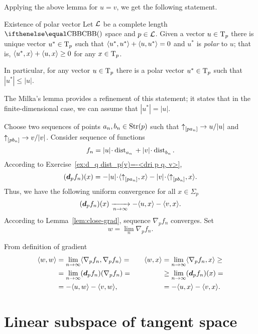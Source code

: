 Applying the above lemma for $u=v$, we get the following statement.

\begin{thm}{Existence of polar vector}\label{cor:polar}
Let $\mathcal{L}$ be a complete length $\Alex{}$ space 
and $p\in \spc{L}$. 
Given a vector $u\in \T_p$ there is unique vector $u^*\in\T_p$ such that $\langle u^*,u^*\rangle+\langle u,u^*\rangle= 0$ and
$u^*$ is \emph{polar} to $u$;
that is,
 $\<u^*,x\>+\<u,x\>\ge 0$ for any $x\in \T_p$.

In particular, for any vector $u\in \T_p$ there is a polar vector $u^*\in\T_p$ such that
$|u^*|\le |u|$.
\end{thm}

The Milka's lemma %
provides a refinement of this statement;
it states that in the finite-dimensional case, we can assume that $|u^*|= |u|$. 

Choose two sequences of points $a_n,b_n\in \Str(p)$ such that $\dir{p}{a_n}\to u/|u|$ and $\dir{p}{b_n}\to v/|v|$.
Consider sequence of functions 
\[f_n=|u|\cdot\distfun{a_n}{}{}+|v|\cdot\distfun{b_n}{}{}.\]
According to Exercise~\ref{ex:d_q dist_p(v)=-<dri p q, v>}, 
\[(\dd_pf_n)(x)=-|u|\cdot\<\dir{p}{a_n},x\>-|v|\cdot\<\dir{p}{b_n},x\>.\]
Thus, we have the following uniform convergence for all $x\in\Sigma_p$
\[(\dd_pf_n)(x)\xto[n\to\infty]{}-\<u,x\>-\<v,x\>.\] 
According to Lemma~\ref{lem:close-grad}, 
sequence $\nabla_pf_n$ converges.
Set 
\[w=\lim_n\nabla_pf_n.\]

From definition of gradient
\[\begin{aligned}
\<w,w\>&=\lim_{n\to\infty}\<\nabla_pf_n,\nabla_pf_n\>=
&&&%
\<w,x\>&=\lim_{n\to\infty}\<\nabla_pf_n,x\>\ge
\\%
&=\lim_{n\to\infty}(\dd_p f_n)(\nabla_p f_n)
=
&&&%
&\ge
\lim_{n\to\infty}(\dd_pf_n)(x)
=
\\%
&=-\<u,w\>-\<v,w\>,
&&&%
&=-\<u,x\>-\<v,x\>.
\end{aligned}\]
\qedsf












\section{Linear subspace of tangent space}

